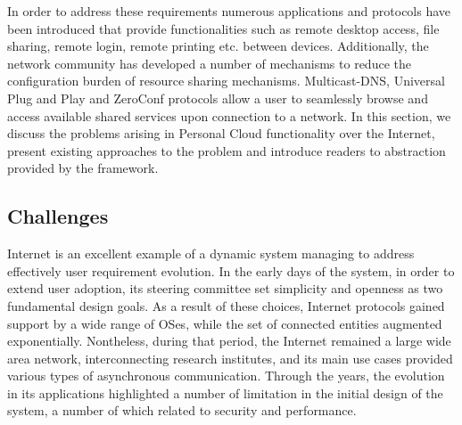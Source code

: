 In order to address these requirements numerous applications and protocols have
been introduced that provide functionalities such as remote desktop access, file
sharing, remote login, remote printing etc.  between devices.  Additionally, the
network community has developed a number of mechanisms to reduce the
configuration burden of resource sharing mechanisms.  Multicast-DNS, Universal
Plug and Play and ZeroConf protocols allow a user to seamlessly browse and
access available shared services upon connection to a network.  In this section,
we discuss the problems arising in Personal Cloud functionality over the
Internet, present existing approaches to the problem and introduce readers to
abstraction provided by the \signpost framework.



\subsection{Challenges}

Internet is an excellent example of a dynamic system managing to address
effectively user requirement evolution.  In the early days of the system, in
order to extend user adoption, its  steering committee set simplicity and
openness as two fundamental design goals.  As a result of these choices,
Internet protocols gained support by a wide range of OSes, while the set of
connected entities augmented exponentially.  Nontheless, during that period, the
Internet remained a large wide area network, interconnecting research
institutes, and its main use cases provided various types of asynchronous
communication. Through the years, the evolution in its applications highlighted
a number of limitation in the initial design of the system, a number of which
related to security and performance.


